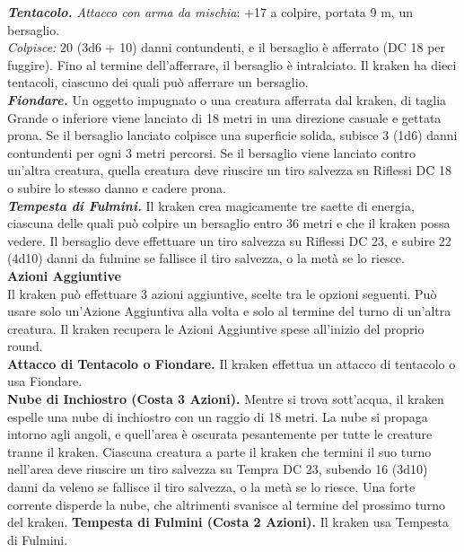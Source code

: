 \begin{multicols}{2}
\emph{\textbf{Tentacolo.} Attacco con arma da mischia}: +17 a colpire, portata 9 m, un bersaglio.\\

\emph{Colpisce:} 20 (3d6 + 10) danni contundenti, e il bersaglio è afferrato (DC 18 per fuggire). Fino al termine dell'afferrare, il bersaglio è intralciato. Il kraken ha dieci tentacoli, ciascuno dei quali può afferrare un bersaglio.\\

\emph{\textbf{Fiondare.}} Un oggetto impugnato o una creatura afferrata dal kraken, di taglia Grande o inferiore viene lanciato di 18 metri in una direzione casuale e gettata prona. Se il bersaglio lanciato colpisce una superficie solida, subisce 3 (1d6) danni contundenti per ogni 3 metri percorsi. Se il bersaglio viene lanciato contro un'altra creatura, quella creatura deve riuscire un tiro salvezza su Riflessi DC 18 o subire lo stesso danno e cadere prona.\\

\emph{\textbf{Tempesta di Fulmini.}} Il kraken crea magicamente tre saette di energia, ciascuna delle quali può colpire un bersaglio entro 36 metri e che il kraken possa vedere. Il bersaglio deve effettuare un tiro salvezza su Riflessi DC 23, e subire 22 (4d10) danni da fulmine se fallisce il tiro salvezza, o la metà se lo riesce.\\

\textbf{Azioni Aggiuntive}\\

Il kraken può effettuare 3 azioni aggiuntive, scelte tra le opzioni seguenti. Può usare solo un'Azione Aggiuntiva alla volta e solo al termine del turno di un'altra creatura. Il kraken recupera le Azioni Aggiuntive spese all'inizio del proprio round.\\

\textbf{Attacco di Tentacolo o Fiondare.} Il kraken effettua un attacco di tentacolo o usa Fiondare.\\

\textbf{Nube di Inchiostro (Costa 3 Azioni).} Mentre si trova sott'acqua, il kraken espelle una nube di inchiostro con un raggio di 18 metri. La nube si propaga intorno agli angoli, e quell'area è oscurata pesantemente per tutte le creature tranne il kraken. Ciascuna creatura a parte il kraken che termini il suo turno nell'area deve riuscire un tiro salvezza su Tempra DC 23, subendo 16 (3d10) danni da veleno se fallisce il tiro salvezza, o la metà se lo riesce. Una forte corrente disperde la nube, che altrimenti svanisce al termine del prossimo turno del kraken. \textbf{Tempesta di Fulmini (Costa 2 Azioni).} Il kraken usa Tempesta di Fulmini.\\


\end{multicols}
